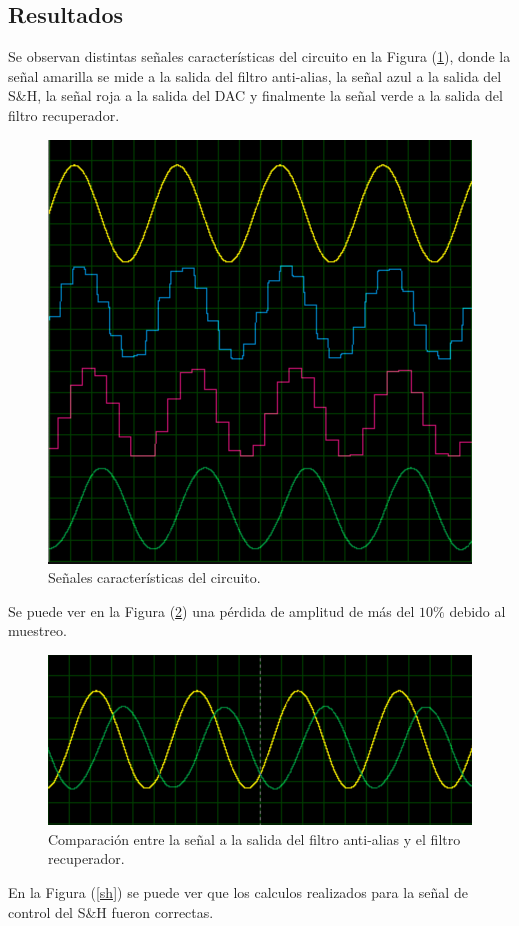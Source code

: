 \subsection{Resultados}

Se observan distintas señales características del circuito en la Figura (\ref{result1}), donde la señal amarilla se mide a la salida del filtro anti-alias, la señal azul a la salida del S\&H, la señal roja a la salida del DAC y finalmente la señal verde a la salida del filtro recuperador.

\begin{figure}[H]
\centering
\includegraphics[width=0.6\linewidth, page=1]{ImagenesEjercicio1/result1.png}
\caption{Señales características del circuito.}
\label{result1}
\end{figure}

Se puede ver en la Figura (\ref{result2}) una pérdida de amplitud de más del $10\%$ debido al muestreo.

\begin{figure}[H]
\centering
\includegraphics[width=0.8\linewidth, page=1]{ImagenesEjercicio1/result2.png}
\caption{Comparación entre la señal a la salida del filtro anti-alias y el filtro recuperador.}
\label{result2}
\end{figure}

En la Figura (\ref{sh}) se puede ver que los calculos realizados para la señal de control del S\&H fueron correctas.

